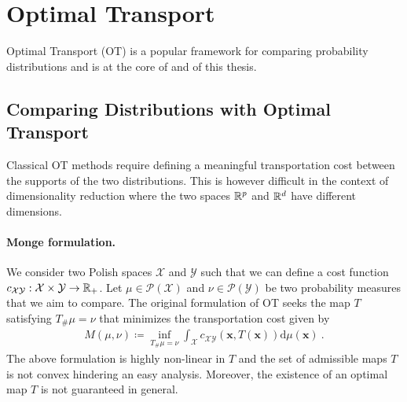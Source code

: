 \section{Optimal Transport}\label{sec:background_ot}

Optimal Transport (OT) \citep{villani2009optimal,peyre2019computational} is a popular
framework for comparing probability distributions and is at the core of  and  of this thesis.

\subsection{Comparing Distributions with Optimal Transport}


Classical OT methods require defining a meaningful transportation cost between the supports of the two distributions. 
This is however difficult in the context of dimensionality reduction where the two spaces $\mathbb{R}^p$ and $\mathbb{R}^d$ have different dimensions.


\paragraph{Monge formulation.}
We consider two Polish spaces $\mathcal{X}$ and $\mathcal{Y}$ such that we can define a cost function $c_{\mathcal{X} \mathcal{Y}} : \mathcal{X} \times \mathcal{Y} \to \mathbb{R}_+$. Let $\mu \in \mathcal{P}(\mathcal{X})$ and $\nu \in \mathcal{P}(\mathcal{Y})$ be two probability measures that we aim to compare.
The original formulation \cite{monge1781memoire} of OT seeks the map $T$ satisfying $T_{\#}\mu = \nu$ that minimizes the transportation cost given by
\begin{align}\label{eq:monge_pb}
	M(\mu, \nu) \coloneqq \inf_{T_{\#}\mu = \nu} \int_{\mathcal{X}} c_{\mathcal{X} \mathcal{Y}}(\bm{x}, T(\bm{x})) \mathrm{d}\mu(\bm{x}) \:.
\end{align}
The above formulation is highly non-linear in $T$ and the set of admissible maps $T$ is not convex hindering an easy analysis. Moreover, the existence of an optimal map $T$ is not guaranteed in general.

